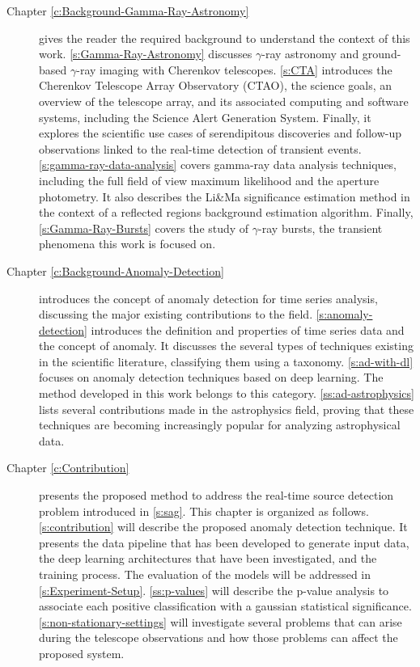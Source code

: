 \begin{description}

  \item[Chapter \ref{c:Background-Gamma-Ray-Astronomy}] gives the reader the required background to understand the context of this work. \autoref{s:Gamma-Ray-Astronomy} discusses $\gamma$-ray astronomy and ground-based $\gamma$-ray imaging with Cherenkov telescopes. \autoref{s:CTA} introduces the Cherenkov Telescope Array Observatory (CTAO), the science goals, an overview of the telescope array, and its associated computing and software systems, including the Science Alert Generation System. Finally, it explores the scientific use cases of serendipitous discoveries and follow-up observations linked to the real-time detection of transient events. \autoref{s:gamma-ray-data-analysis} covers gamma-ray data analysis techniques, including the full field of view maximum likelihood and the aperture photometry. It also describes the Li\&Ma significance estimation method in the context of a reflected regions background estimation algorithm. Finally, \autoref{s:Gamma-Ray-Bursts} covers the study of $\gamma$-ray bursts, the transient phenomena this work is focused on.
  
  \item[Chapter \ref{c:Background-Anomaly-Detection}] introduces the concept of anomaly detection for time series analysis, discussing the major existing contributions to the field. \autoref{s:anomaly-detection} introduces the definition and properties of time series data and the concept of anomaly. It discusses the several types of techniques existing in the scientific literature, classifying them using a taxonomy. \autoref{s:ad-with-dl} focuses on anomaly detection techniques based on deep learning. The method developed in this work belongs to this category. \autoref{ss:ad-astrophysics} lists several contributions made in the astrophysics field, proving that these techniques are becoming increasingly popular for analyzing astrophysical data.


  \item[Chapter \ref{c:Contribution}] presents the proposed method to address the real-time source detection problem introduced in \autoref{s:sag}. This chapter is organized as follows. \autoref{s:contribution} will describe the proposed anomaly detection technique. It presents the data pipeline that has been developed to generate input data, the deep learning architectures that have been investigated, and the training process. The evaluation of the models will be addressed in \autoref{s:Experiment-Setup}. \autoref{ss:p-values} will describe the p-value analysis to associate each positive classification with a gaussian statistical significance. \autoref{s:non-stationary-settings} will investigate several problems that can arise during the telescope observations and how those problems can affect the proposed system.


\end{description}
